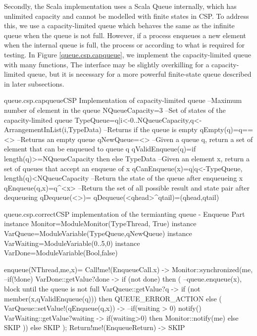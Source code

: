 \documentclass[a4paper, 12pt]{article}
\begin{document}
Secondly, the Scala implementation uses a Scala Queue internally, which has unlimited capacity and cannot be modelled with finite states in CSP. To address this, we use a capacity-limited queue which behaves the same as the infinite queue when the queue is not full. However, if a process enqueues a new element when the internal queue is full, the process  or  according to what is required for testing. In Figure \ref{queue.csp.capqueue}, we implement the capacity-limited queue with many functions, The interface may be slightly overkilling for a capacity-limited queue, but it is necessary for a more powerful finite-state queue described in later subsections. 

\begin{cspfloat}{queue.csp.capqueue}{CSP Implementation of capacity-limited queue}
--Maximum number of element in the queue
NQueueCapacity=3
--Set of states of the capacity-limited queue
TypeQueue={q|i<-{0..NQueueCapacity},q<-ArrangementInList(i,TypeData)}
--Returns if the queue is empty
qEmpty(q)=q==<>
--Returns an empty queue
qNewQueue=<>
--Given a queue q, return a set of element that can be enqueued to queue q
qValidEnqueue(q)=if length(q)>=NQueueCapacity then {} else TypeData
--Given an element x, return a set of queues that accept an enqueue of x
qCanEnqueue(x)={q|q<-TypeQueue, length(q)<NQueueCapacity}
--Return the state of the queue after enqueueing x
qEnqueue(q,x)=q^<x>
--Return the set of all possible result and state pair after dequeueing
qDequeue(<>)={}
qDequeue(<qhead>^qtail)={(qhead,qtail)}
\end{cspfloat}

\begin{cspfloat}{queue.csp.correct}{CSP implementation of the termianting queue - Enqueue Part}
instance Monitor=ModuleMonitor(TypeThread, True)
instance VarQueue=ModuleVariable(TypeQueue,qNewQueue)
instance VarWaiting=ModuleVariable({0..5},0)
instance VarDone=ModuleVariable(Bool,false)

enqueue(NThread,me,x)=
  Call!me!(EnqueueCall.x) ->
  Monitor::synchronized(me,
    --if(!done)
    VarDone::getValue?done ->
    if (not done) then (
      --queue.enqueue(x), block until the queue is not full
      VarQueue::getValue?q ->
      if (not member(x,qValidEnqueue(q))) then QUEUE_ERROR_ACTION
      else (
        VarQueue::setValue!(qEnqueue(q,x)) ->
        --if(waiting > 0) notify()
        VarWaiting::getValue?waiting ->
        if(waiting>0) then Monitor::notify(me) else SKIP
    )) else SKIP
  );
  Return!me!(EnqueueReturn) ->
  SKIP






















  ⠀
\end{cspfloat}
\end{document}
